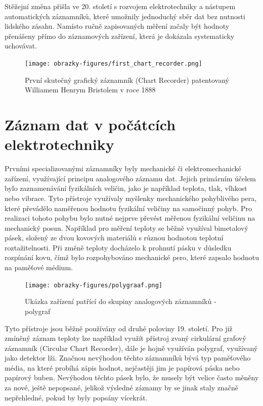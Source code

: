 Stěžejní změna přišla ve 20. století s rozvojem elektrotechniky a nástupem automatických záznamníků, které umožnily jednoduchý sběr dat bez nutnosti lidského zásahu. Namísto ručně zapisovaných měření začaly být hodnoty přenášeny přímo do záznamových zařízení, která je dokázala systematicky uchovávat. \cite{origin_of_chart_recorders}

\begin{figure}[h] %
    \centering
    \texttt{[image: obrazky-figures/first\_chart\_recorder.png]}
    \caption{První skutečný grafický záznamník (Chart Recorder) patentovaný Williamem Henrym Bristolem v roce 1888 \cite{bristol_chart_recorders}}
    \label{fig:chart_recorder}  
\end{figure}

\section{Záznam dat v počátcích elektrotechniky}
\label{zaznam}
Prvními specializovanými záznamníky byly mechanické či elektromechanické zařízení, využívající principu analogového záznamu dat. Jejich primárním účelem bylo zaznamenávání fyzikálních veličin, jako je například teplota, tlak, vlhkost nebo vibrace. Tyto přístroje využívaly myšlenky mechanického pohyblivého pera, které převádělo naměřenou hodnotu fyzikální veličiny na samočinný pohyb. Pro realizaci tohoto pohybu bylo nutné nejprve převést měřenou fyzikální veličinu na mechanický posun. Například pro měření teploty se běžně využíval bimetalový pásek, složený ze dvou kovových materiálů s různou hodnotou teplotní roztažitelnosti. Při změně teploty docházelo k prohnutí pásku v důsledku rozpínání kovu, čímž bylo rozpohybováno mechanické pero, které zapsalo hodnotu na paměťové médium. 


\begin{figure}[h] %
    \centering
    \texttt{[image: obrazky-figures/polygraaf.png]}
    \caption{Ukázka zařízení patřící do skupiny analogových záznamníků - polygraf \cite{polygraph_picture}}
    \label{fig:polygraaf}
\end{figure}


Tyto přístroje jsou běžně používány od druhé poloviny 19. století. Pro již zmíněný záznam teploty lze například využít přístroj zvaný cirkulární grafový záznamník (Circular Chart Recorder), dále je hojně využíván polygraf, využívaný jako detektor lži. Značnou nevýhodou těchto záznamníků bývá typ paměťového média, na které probíhá zápis hodnot, nejčastěji jim je papírová páska nebo papírový buben. Nevýhodou těchto pásek bylo, že musely být velice často měněny za nové, ještě nepopsané, jelikož výsledné záznamy by se jinak staly značně nepřehledné, pokud by byly popsány vícekrát. \cite{origin_of_chart_recorders}

